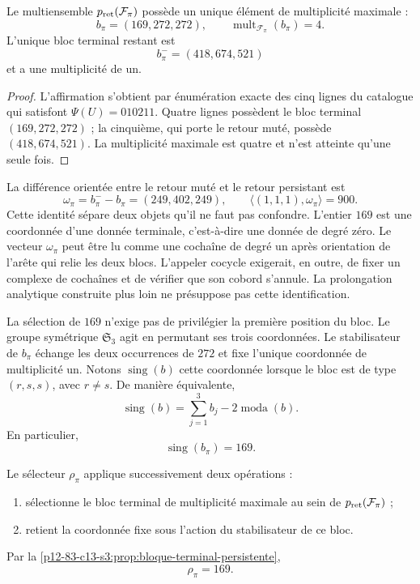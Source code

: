 \begin{proposition}
\label{p12-83-c13-s3:prop:bloque-terminal-persistente}
Le multiensemble \(p_{\rm ret}(\mathcal F_\pi)\) possède un unique élément de
multiplicité maximale :
\[
b_\pi=(169,272,272),
\qquad
\operatorname{mult}_{\mathcal F_\pi}(b_\pi)=4.
\]
L'unique bloc terminal restant est
\[
b_\pi^-=(418,674,521)
\]
et a une multiplicité de un.
\end{proposition}

\begin{proof}
L'affirmation s'obtient par énumération exacte des cinq lignes du catalogue qui satisfont \(\Psi(U)=010211\). Quatre lignes possèdent le bloc terminal \((169,272,272)\) ; la cinquième, qui porte le retour muté, possède \((418,674,521)\). La multiplicité maximale est quatre et n'est atteinte qu'une seule fois.
\end{proof}

La différence orientée entre le retour muté et le retour persistant est
\[
 \omega_\pi=b_\pi^- - b_\pi=(249,402,249),
 \qquad
 \langle(1,1,1),\omega_\pi\rangle=900.
\]
Cette identité sépare deux objets qu'il ne faut pas confondre. L'entier
\(169\) est une coordonnée d'une donnée terminale, c'est-à-dire une donnée de degré
zéro. Le vecteur \(\omega_\pi\) peut être lu comme une cochaîne de degré un
après orientation de l'arête qui relie les deux blocs. L'appeler cocycle exigerait,
en outre, de fixer un complexe de cochaînes et de vérifier que son cobord s'annule.
La prolongation analytique construite plus loin ne présuppose pas cette
identification.

La sélection de \(169\) n'exige pas de privilégier la première position du bloc.
Le groupe symétrique \(\mathfrak S_3\) agit en permutant ses trois coordonnées.
Le stabilisateur de \(b_\pi\) échange les deux occurrences de \(272\) et
fixe l'unique coordonnée de multiplicité un. Notons
\(\operatorname{sing}(b)\) cette coordonnée lorsque le bloc est de type
\((r,s,s)\), avec \(r\ne s\). De manière équivalente,
\[
\operatorname{sing}(b)
=\sum_{j=1}^3b_j-2\operatorname{moda}(b).
\]
En particulier,
\[
\boxed{\operatorname{sing}(b_\pi)=169.}
\]

\begin{definition}
\label{p12-83-c13-s3:def:selector-residual-pi}
Le sélecteur \(\rho_\pi\) applique successivement deux opérations :
\begin{enumerate}
  \item sélectionne le bloc terminal de multiplicité maximale au sein de \(p_{\rm ret}(\mathcal F_\pi)\) ;
  \item retient la coordonnée fixe sous l'action du stabilisateur de ce bloc.
\end{enumerate}
Par la \cref{p12-83-c13-s3:prop:bloque-terminal-persistente},
\[
\boxed{\rho_\pi=169.}
\]
\end{definition}

